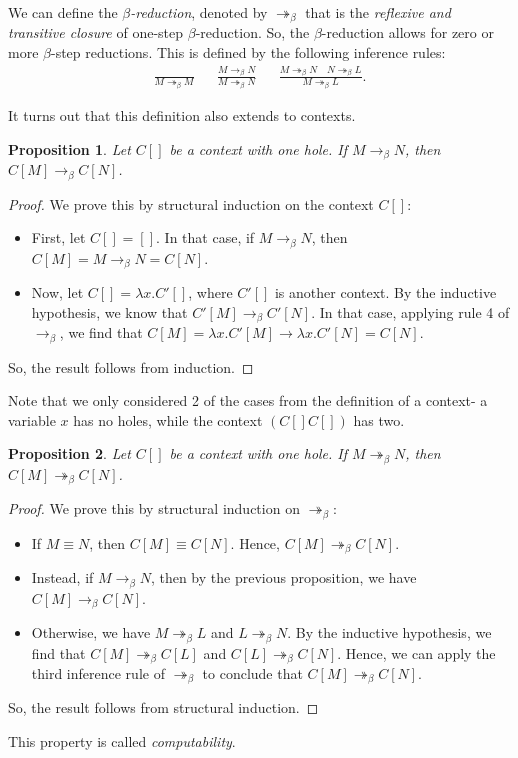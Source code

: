 \documentclass[a4paper, openany]{memoir}
\newtheorem{proposition}{Proposition}[section]
\theoremstyle{definition}
\begin{document}
    We can define the \emph{$\beta$-reduction}, denoted by $\twoheadrightarrow_\beta$ that is the \emph{reflexive and transitive closure} of one-step $\beta$-reduction. So, the $\beta$-reduction allows for zero or more $\beta$-step reductions. This is defined by the following inference rules:
    \begin{align*}
        \frac{}{M \twoheadrightarrow_\beta M} && \frac{M \to_\beta N}{M \twoheadrightarrow_\beta N} && \frac{M \twoheadrightarrow_\beta N \quad N \twoheadrightarrow_\beta L}{M \twoheadrightarrow_\beta L}.
    \end{align*}

    It turns out that this definition also extends to contexts.
    \begin{proposition}
        Let $C[]$ be a context with one hole. If $M \to_\beta N$, then $C[M] \to_\beta C[N]$.
    \end{proposition}
    \begin{proof}
        We prove this by structural induction on the context $C[]$:
        \begin{itemize}
            \item First, let $C[] = []$. In that case, if $M \to_\beta N$, then $C[M] = M \to_\beta N = C[N]$.
            \item Now, let $C[] = \lambda x.C'[]$, where $C'[]$ is another context. By the inductive hypothesis, we know that $C'[M] \to_\beta C'[N]$. In that case, applying rule 4 of $\to_\beta$, we find that $C[M] = \lambda x.C'[M] \to \lambda x.C'[N] = C[N]$.
        \end{itemize}
        So, the result follows from induction.
    \end{proof}
    \noindent Note that we only considered 2 of the cases from the definition of a context- a variable $x$ has no holes, while the context $(C[] C[])$ has two. 
    \begin{proposition}
        Let $C[]$ be a context with one hole.  If $M \twoheadrightarrow_\beta N$, then $C[M] \twoheadrightarrow_\beta C[N]$.
    \end{proposition}
    \begin{proof}
        We prove this by structural induction on $\twoheadrightarrow_\beta$:
        \begin{itemize}
            \item If $M \equiv N$, then $C[M] \equiv C[N]$. Hence, $C[M] \twoheadrightarrow_\beta C[N]$.
            \item Instead, if $M \to_\beta N$, then by the previous proposition, we have $C[M] \to_\beta C[N]$. 
            \item Otherwise, we have $M \twoheadrightarrow_\beta L$ and $L \twoheadrightarrow_\beta N$. By the inductive hypothesis, we find that $C[M] \twoheadrightarrow_\beta C[L]$ and $C[L] \twoheadrightarrow_\beta C[N]$. Hence, we can apply the third inference rule of $\twoheadrightarrow_\beta$ to conclude that $C[M] \twoheadrightarrow_\beta C[N]$.
        \end{itemize}
        So, the result follows from structural induction.
    \end{proof}
    \noindent This property is called \emph{computability}.
    \newpage
\end{document}
